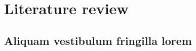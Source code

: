 \chapter{Literature review}%
\label{ch:literature_review}

\section{Aliquam vestibulum fringilla lorem}

\lipsum[1]

\lipsum[2]
